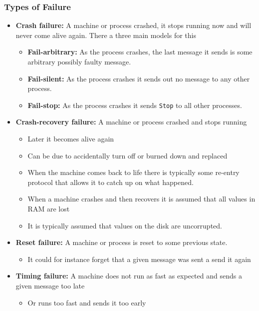 \documentclass[11pt]{article}
\begin{document}
\subsubsection{Types of Failure}
\label{sec:org9c135c3}
\begin{itemize}
\item \textbf{Crash failure:} A machine or process crashed, it stops running now and will never come alive again. There a three main models for this
\begin{itemize}
\item \textbf{Fail-arbitrary:} As the process crashes, the last message it sends is some arbitrary possibly faulty message.
\item \textbf{Fail-silent:} As the process crashes it sends out no message to any other process.
\item \textbf{Fail-stop:} As the process crashes it sends \texttt{Stop} to all other processes.
\end{itemize}

\item \textbf{Crash-recovery failure:} A machine or process crashed and stops running
\begin{itemize}
\item Later it becomes alive again
\item Can be due to accidentally turn off or burned down and replaced
\item When the machine comes back to life there is typically some re-entry protocol that allows it to catch up on what happened.
\item When a machine crashes and then recovers it is assumed that all values in RAM are lost
\item It is typically assumed that values on the disk are uncorrupted.
\end{itemize}

\item \textbf{Reset failure:} A machine or process is reset to some previous state.
\begin{itemize}
\item It could for instance forget that a given message was sent a send it again
\end{itemize}

\item \textbf{Timing failure:} A machine does not run as fast as expected and sends a given message too late
\begin{itemize}
\item Or runs too fast and sends it too early
\end{itemize}


\end{itemize}
\end{document}
